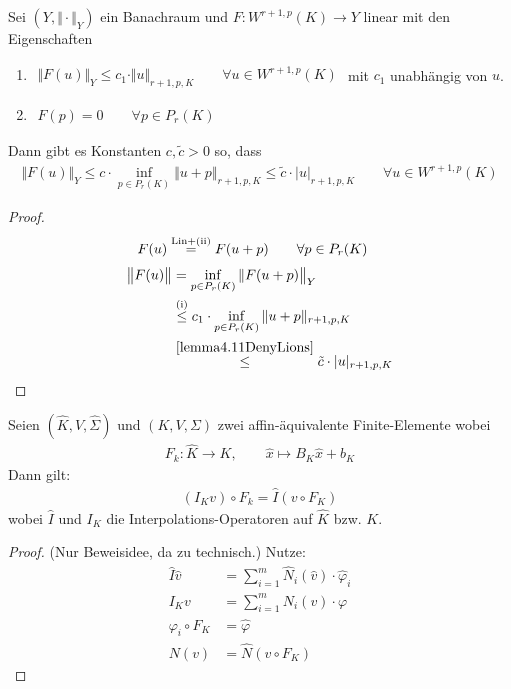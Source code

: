 \begin{lemma}\label{lemma4.12BrambleHilbert}
Sei $(Y,\Vert\cdot\Vert_Y)$ ein Banachraum und $F:W^{r+1,p}(K)\to Y$ linear mit den Eigenschaften
\begin{enumerate}[label=(\roman*)]
\item $\begin{aligned}
\big\Vert F(u)\Vert_Y\leq c_1\cdot\Vert u\Vert_{r+1,p,K}\qquad\forall u\in W^{r+1,p}(K)
\end{aligned}$ mit $c_1$ unabhängig von $u$.
\item $\begin{aligned}
F(p)=0\qquad\forall p\in P_r(K)
\end{aligned}$
\end{enumerate}
Dann gibt es Konstanten $c,\tilde{c}>0$ so, dass
\begin{align*}
\big\Vert F(u)\big\Vert_Y
\leq c\cdot\inf\limits_{p\in P_r(K)}\Vert u+p\Vert_{r+1,p,K}
\leq
\tilde{c}\cdot |u|_{r+1,p,K}\qquad\forall u\in W^{r+1,p}(K)
\end{align*}
\end{lemma}
\begin{proof}
\begin{align*}
F(u)&\stackrel{\text{Lin+(ii)}}{=}F(u+p)\qquad\forall p\in P_r(K)
\end{align*}
\begin{align*}
\big\Vert F(u)\big\Vert&=\inf\limits_{p\in P_r(K)}\Vert F(u+p)\big\Vert_Y\\
&\stackrel{\text{(i)}}{\leq}
c_1\cdot\inf\limits_{p\in P_r(K)}\Vert u+p\Vert_{r+1,p,K}\\
&\stackrel{\ref{lemma4.11DenyLions}}{\leq}
\tilde{c}\cdot |u|_{r+1,p,K}
\end{align*}
\end{proof}

\begin{lemma}\label{lemma4.13}
Seien $(\hat{K},\hat{V},\hat{\Sigma})$ und $(K,V,\Sigma)$ zwei affin-äquivalente Finite-Elemente wobei
\begin{align*}
F_k:\hat{K}\to K,\qquad\hat{x}\mapsto B_K\hat{x}+b_K
\end{align*}
Dann gilt:
\begin{align*}
(I_K v)\circ F_k=\hat{I}(v\circ F_K)
\end{align*}
wobei $\hat{I}$ und $I_K$ die Interpolations-Operatoren auf $\hat{K}$ bzw. $K$.
\end{lemma}
\begin{proof}
(Nur Beweisidee, da zu technisch.)
Nutze:
\begin{align*}
\hat{I}\hat{v}&=\sum\limits_{i=1}^m\hat{N}_i(\hat{v})\cdot\hat{\varphi}_i\\
I_K v&=\sum\limits_{i=1}^m N_i(v)\cdot\varphi\\
\varphi_i\circ F_K&=\hat{\varphi}\\
N(v)&=\hat{N}(v\circ F_K)
\end{align*}
\end{proof}

